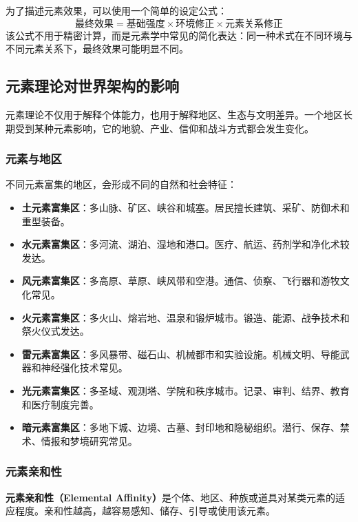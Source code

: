 为了描述元素效果，可以使用一个简单的设定公式：
\begin{equation}
    \text{最终效果}=\text{基础强度}\times\text{环境修正}\times\text{元素关系修正}
\end{equation}
该公式不用于精密计算，而是元素学中常见的简化表达：同一种术式在不同环境与不同元素关系下，最终效果可能明显不同。

\subsection{元素理论对世界架构的影响}\label{subsec:elementinfluence}

元素理论不仅用于解释个体能力，也用于解释地区、生态与文明差异。一个地区长期受到某种元素影响，它的地貌、产业、信仰和战斗方式都会发生变化。

\subsubsection{元素与地区}

不同元素富集的地区，会形成不同的自然和社会特征：
\begin{itemize}
    \item \textbf{土元素富集区}：多山脉、矿区、峡谷和城塞。居民擅长建筑、采矿、防御术和重型装备。
    \item \textbf{水元素富集区}：多河流、湖泊、湿地和港口。医疗、航运、药剂学和净化术较发达。
    \item \textbf{风元素富集区}：多高原、草原、峡风带和空港。通信、侦察、飞行器和游牧文化常见。
    \item \textbf{火元素富集区}：多火山、熔岩地、温泉和锻炉城市。锻造、能源、战争技术和祭火仪式发达。
    \item \textbf{雷元素富集区}：多风暴带、磁石山、机械都市和实验设施。机械文明、导能武器和神经强化技术常见。
    \item \textbf{光元素富集区}：多圣域、观测塔、学院和秩序城市。记录、审判、结界、教育和医疗制度完善。
    \item \textbf{暗元素富集区}：多地下城、边境、古墓、封印地和隐秘组织。潜行、保存、禁术、情报和梦境研究常见。
\end{itemize}

\subsubsection{元素亲和性}

\begin{definition}[元素亲和性]
    \textbf{元素亲和性（Elemental Affinity）}是个体、地区、种族或道具对某类元素的适应程度。亲和性越高，越容易感知、储存、引导或使用该元素。
\end{definition}

